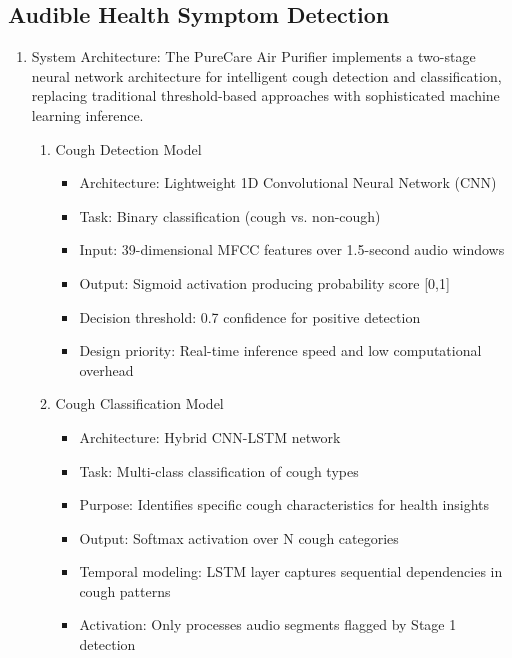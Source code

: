\documentclass[conference]{IEEEtran}
\begin{document}
    \subsection{\textbf{Audible Health Symptom Detection}}
        \begin{enumerate}
            \item System Architecture: 
                The PureCare Air Purifier implements a two-stage neural network architecture for intelligent cough detection and classification, replacing traditional threshold-based approaches with sophisticated machine learning inference.
                \begin{enumerate}
                    \item Cough Detection Model
                        \begin{itemize} 
                            \item Architecture: Lightweight 1D Convolutional Neural Network (CNN) 
                            \item Task: Binary classification (cough vs. non-cough) 
                            \item Input: 39-dimensional MFCC features over 1.5-second audio windows 
                            \item Output: Sigmoid activation producing probability score [0,1] \item Decision threshold: 0.7 confidence for positive detection 
                            \item Design priority: Real-time inference speed and low computational overhead 
                        \end{itemize}
                    \item Cough Classification Model
                        \begin{itemize} 
                            \item Architecture: Hybrid CNN-LSTM network 
                            \item Task: Multi-class classification of cough types 
                            \item Purpose: Identifies specific cough characteristics for health insights 
                            \item Output: Softmax activation over N cough categories \item Temporal modeling: LSTM layer captures sequential dependencies in cough patterns 
                            \item Activation: Only processes audio segments flagged by Stage 1 detection 

\end{itemize}
\end{enumerate}
\end{enumerate}
\end{document}
